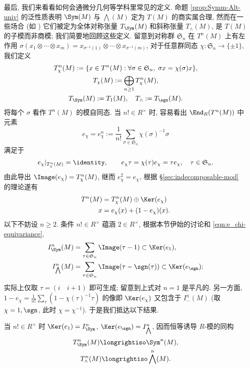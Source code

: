 最后, 我们来看看如何会通微分几何等学科里常见的定义. 命题 \ref{prop:Symm-Alt-univ} 的泛性质表明 $\Sym(M)$ 与 $\bigwedge(M)$ 定为 $T(M)$ 的商实属合理, 然而在一些场合 (如 \cite[\S 2.2]{ChCh}) 它们被定为全体对称张量 $T_{\Sym}(M)$ 和斜称张量 $T_\wedge(M)$, 是 $T(M)$ 的子模而非商模; 我们简要地回顾这些定义. 留意到对称群 $\mathfrak{S}_n$ 在 $T^n(M)$ 上有左作用 $\sigma(x_1 \otimes \cdots \otimes x_m) = x_{\sigma^{-1}(1)} \otimes \cdots \otimes x_{\sigma^{-1}(m)}$, 对于任意群同态 $\chi: \mathfrak{S}_n \to \{\pm 1\}$, 我们定义
\begin{gather*}
	T^n_\chi(M) := \{x \in T^n(M): \forall \sigma \in \mathfrak{S}_n,\; \sigma x = \chi(\sigma)x\}, \\
	T_\chi(M) := \bigoplus_{n \geq 1} T^n_\chi(M), \\
	T_{\Sym}(M) := T_1(M), \quad T_\wedge := T_{\sgn}(M).
\end{gather*}
将每个 $\sigma$ 看作 $T^n(M)$ 的模自同态. 当 $n! \in R^\times$ 时, 容易看出 $\End_R(T^n(M))$ 中元素
\[ e_\chi = e^n_\chi := \frac{1}{n!} \sum_{\sigma \in \mathfrak{S}_n} \chi(\sigma)^{-1} \sigma \]
满足于
\begin{gather}\label{eqn:e_chi-equivariance}
	e_\chi|_{T^n_\chi(M)} = \identity, \qquad e_\chi \tau = \chi(\tau) e_\chi = \tau e_\chi, \quad \tau \in \mathfrak{S}_n.
\end{gather}
由此导出 $\Image(e_\chi) = T^n_\chi(M)$, 继而 $e_\chi^2 = e_\chi$, 根据 \S\ref{sec:indecomposable-mod} 的理论遂有
\begin{align*}
	T^n(M) & = T^n_\chi(M) \oplus \Ker(e_\chi) \\
	x & = e_\chi(x) + (1 - e_\chi)(x).
\end{align*}
以下不妨设 $n \geq 2$. 条件 $n! \in R^\times$ 蕴涵 $2 \in R^\times$, 根据本节伊始的讨论和 \eqref{eqn:e_chi-equivariance},
\begin{align*}
	I^n_{\Sym}(M) & = \sum_{\tau \in \mathfrak{S}_n} \Image(\tau - 1) \subset \Ker(e_1), \\
	I^n_{\bigwedge}(M) & = \sum_{\tau \in \mathfrak{S}_n} \Image(\tau - \sgn(\tau)) \subset \Ker(e_{\sgn});
\end{align*}
实际上仅取 $\tau= (i \quad i+1)$ 即可生成; 留意到上式对 $n=1$ 是平凡的. 另一方面, $1 - e_\chi = \frac{1}{n!} \sum_\tau (1 - \chi(\tau)^{-1} \tau)$ 的像即 $\Ker(e_\chi)$ 又包含于 $I^n_{\cdots}(M)$ (取 $\chi = 1, \sgn$, 此时 $\chi=\chi^{-1}$). 于是我们抵达以下结果.
\begin{theorem}
	当 $n! \in R^\times$ 时 $\Ker(e_1) = I^n_{\Sym}$, $\Ker(e_{\sgn}) = I^n_{\bigwedge}$, 因而恒等诱导 $R$-模的同构
	\begin{gather*}
		T^n_{\Sym}(M) \longrightiso \Sym^n(M), \\
		T^n_\wedge(M) \longrightiso \bigwedge^n(M).
	\end{gather*}
\end{theorem}

